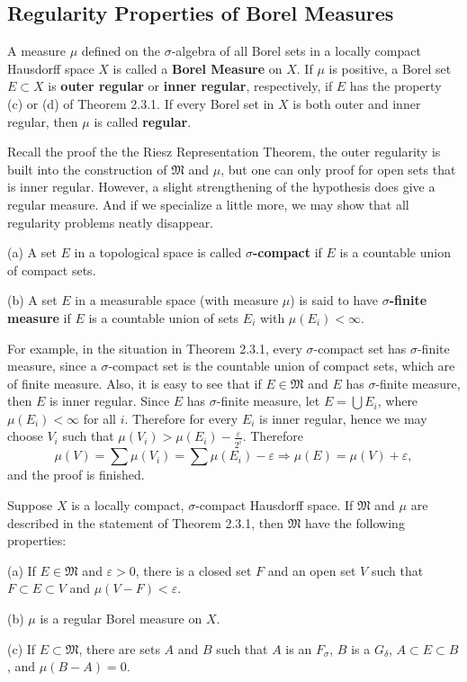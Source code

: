 \subsection{Regularity Properties of Borel Measures}
A measure $\mu$ defined on the $\sigma$-algebra of all Borel sets in a locally compact Hausdorff space $X$ is called a \textbf{Borel Measure} on $X$. If $\mu$ is positive, a Borel set $E\subset X$ is \textbf{outer regular} or \textbf{inner regular}, respectively, if $E$ has the property (c) or (d) of Theorem 2.3.1. If every Borel set in $X$ is both outer and inner regular, then $\mu$ is called \textbf{regular}.\par
Recall the proof the the Riesz Representation Theorem, the outer regularity is built into the construction of $\mathfrak{M}$ and $\mu$, but one can only proof for open sets that is inner regular. However, a slight strengthening of the hypothesis does give a regular measure. And if we specialize a little more, we may show that all regularity problems neatly disappear.
\begin{definition}
(a) A set $E$ in a topological space is called \textbf{$\sigma$-compact} if $E$ is a countable union of compact sets.\par
(b) A set $E$ in a measurable space (with measure $\mu$) is said to have \textbf{$\sigma$-finite measure} if $E$ is a countable union of sets $E_i$ with $\mu(E_i)<\infty$.
\end{definition}
For example, in the situation in Theorem 2.3.1, every $\sigma$-compact set has $\sigma$-finite measure, since a $\sigma$-compact set is the countable union of compact sets, which are of finite measure. Also, it is easy to see that if $E\in\mathfrak{M}$ and $E$ has $\sigma$-finite measure, then $E$ is inner regular. Since $E$ has $\sigma$-finite measure, let $E=\bigcup E_i$, where $\mu(E_i)<\infty$ for all $i$. Therefore for every $E_i$ is inner regular, hence we may choose $V_i$ such that $\mu(V_i)>\mu(E_i)-\frac{\varepsilon}{2^i}$. Therefore 
$$
\mu \left( V \right) =\sum{\mu \left( V_i \right)}=\sum{\mu \left( E_i \right)}-\varepsilon \Rightarrow \mu \left( E \right) =\mu \left( V \right) +\varepsilon ,
$$
and the proof is finished.
\begin{theorem}
Suppose $X$ is a locally compact, $\sigma$-compact Hausdorff space. If $\mathfrak{M}$ and $\mu$ are described in the statement of Theorem 2.3.1, then $\mathfrak{M}$ have the following properties:\par
(a) If $E\in\mathfrak{M}$ and $\varepsilon>0$, there is a closed set $F$ and an open set $V$ such that $F\subset E\subset V$ and $\mu(V-F)<\varepsilon$.\par
(b) $\mu$ is a regular Borel measure on $X$.\par
(c) If $E\subset\mathfrak{M}$, there are sets $A$ and $B$ such that $A$ is an $F_\sigma$, $B$ is a $G_\delta$, $A\subset E\subset B$, and $\mu(B-A)=0$.
\end{theorem}
